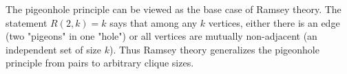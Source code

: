 \begin{remark} \label{remark:pigeonhole_principle_as_ramsey_number_base_case}
The pigeonhole principle can be viewed as the base case of Ramsey theory. The statement $R(2,k) = k$ says that among any $k$ vertices, either there is an edge (two "pigeons" in one "hole") or all vertices are mutually non-adjacent (an independent set of size $k$). Thus Ramsey theory generalizes the pigeonhole principle from pairs to arbitrary clique sizes.
\end{remark}
